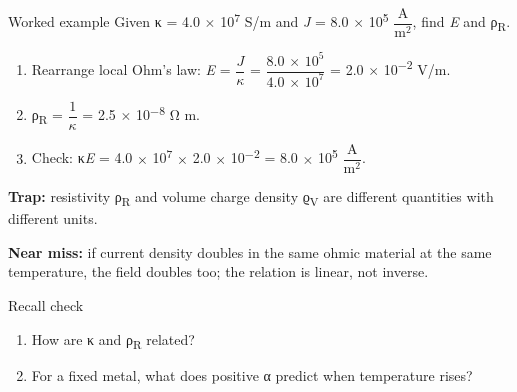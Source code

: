 \documentclass[11pt]{article}
\begin{document}
\begin{keepsection}
\begin{workedbox}{Worked example}
Given κ = 4.0 \ensuremath{\times} 10\textsuperscript{7} S/m and \textit{J} = 8.0 \ensuremath{\times} 10\textsuperscript{5} {\small\ensuremath{\dfrac{\mathrm{A}}{\mathrm{m}^{2}}}}, find \textit{E} and ρ\textsubscript{R}.

\begin{enumerate}
\item Rearrange local Ohm’s law: \textit{E} = {\small\ensuremath{\dfrac{{J}}{κ}}} = {\small\ensuremath{\dfrac{8.0\, \times \, 10^{5}}{4.0\, \times \, 10^{7}}}} = 2.0 \ensuremath{\times} 10\textsuperscript{\ensuremath{-}2} V/m.
\item ρ\textsubscript{R} = {\small\ensuremath{\dfrac{1}{κ}}} = 2.5 \ensuremath{\times} 10\textsuperscript{\ensuremath{-}8} Ω m.
\item Check: κ\textit{E} = 4.0 \ensuremath{\times} 10\textsuperscript{7} \ensuremath{\times} 2.0 \ensuremath{\times} 10\textsuperscript{\ensuremath{-}2} = 8.0 \ensuremath{\times} 10\textsuperscript{5} {\small\ensuremath{\dfrac{\mathrm{A}}{\mathrm{m}^{2}}}}.
\end{enumerate}
\end{workedbox}

\begin{notebox}\textbf{Trap:} resistivity ρ\textsubscript{R} and volume charge density ϱ\textsubscript{V} are different quantities with different units.\end{notebox}

\begin{notebox}\textbf{Near miss:} if current density doubles in the same ohmic material at the same temperature, the field doubles too; the relation is linear, not inverse.\end{notebox}

\begin{recallbox}{Recall check}
\begin{enumerate}
\item How are κ and ρ\textsubscript{R} related?
\item For a fixed metal, what does positive α predict when temperature rises?
\end{enumerate}

\end{recallbox}
\end{keepsection}
\end{document}
